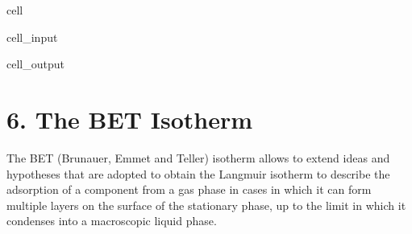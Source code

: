 \documentclass[letterpaper,10pt,english]{jupyterBook}
\begin{document}
\begin{sphinxuseclass}{cell}
\begin{sphinxVerbatimInput}
\begin{sphinxuseclass}{cell_input}
\begin{sphinxVerbatim}[commandchars=\\\{\}]
 
 
\PYG{p}{[}\PYG{p}{]} 
\end{sphinxVerbatim}

\end{sphinxuseclass}\end{sphinxVerbatimInput}
\begin{sphinxVerbatimOutput}

\begin{sphinxuseclass}{cell_output}
\noindent{}

\end{sphinxuseclass}\end{sphinxVerbatimOutput}

\end{sphinxuseclass}
\sphinxstepscope


\section{6. The BET Isotherm}
\label{\detokenize{BET_isotherm:the-bet-isotherm}}\label{\detokenize{BET_isotherm::doc}}
\sphinxAtStartPar
The BET (Brunauer, Emmet and Teller) isotherm allows to extend ideas and hypotheses that are adopted to obtain the Langmuir isotherm to describe the adsorption of a component from a gas phase in cases in which it can form multiple layers on the surface of the stationary phase, up to the limit in which it condenses into a macroscopic liquid phase.
\end{document}
